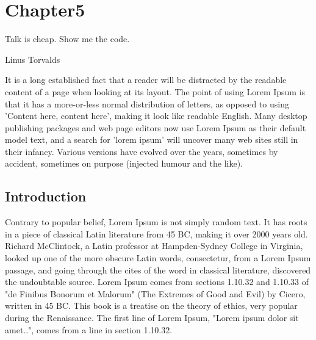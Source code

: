 %
\chapter{Chapter5}
\addtocounter{footnote}{-1}  %
\markboth{}{} %
\thispagestyle{noheadrule}
\label{ch:chapter5}
\pgfmathsetmacro\chapclr{\colourarray[5]}
\hypersetup{
  citecolor  = \chapclr,
  linkcolor  = \chapclr,
  urlcolor   = \chapclr,
}

\epigraph{
  Talk is cheap. Show me the code.
}{
  Linus Torvalds
}

\begin{center}
    \begin{minipage}{\abstractwidth\textwidth}
      \begin{small}
        It is a long established fact that a reader will be distracted by the readable content of a page when looking at its layout.
        The point of using Lorem Ipsum is that it has a more-or-less normal distribution of letters, as opposed to using 'Content here, content here', making it look like readable English.
        Many desktop publishing packages and web page editors now use Lorem Ipsum as their default model text, and a search for 'lorem ipsum' will uncover many web sites still in their infancy.
        Various versions have evolved over the years, sometimes by accident, sometimes on purpose (injected humour and the like).
      \end{small}
    \end{minipage}
    \vspace{0.5cm}
\end{center}
\clearpage

\section{Introduction}

  Contrary to popular belief, Lorem Ipsum is not simply random text.
  It has roots in a piece of classical Latin literature from 45 BC, making it over 2000 years old.
  Richard McClintock, a Latin professor at Hampden-Sydney College in Virginia, looked up one of the more obscure Latin words, consectetur, from a Lorem Ipsum passage, and going through the cites of the word in classical literature, discovered the undoubtable source.
  Lorem Ipsum comes from sections 1.10.32 and 1.10.33 of "de Finibus Bonorum et Malorum" (The Extremes of Good and Evil) by Cicero, written in 45 BC.
  This book is a treatise on the theory of ethics, very popular during the Renaissance. The first line of Lorem Ipsum, "Lorem ipsum dolor sit amet..", comes from a line in section 1.10.32.

